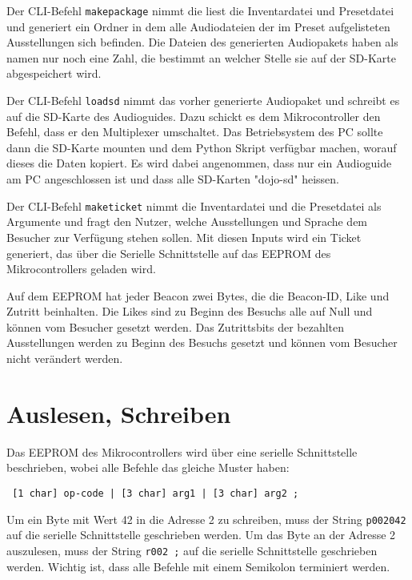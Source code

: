 Der CLI-Befehl \texttt{makepackage} nimmt die liest die Inventardatei und Presetdatei und generiert ein Ordner in dem alle Audiodateien der im Preset aufgelisteten Ausstellungen sich befinden.
Die Dateien des generierten Audiopakets haben als namen nur noch eine Zahl, die bestimmt an welcher Stelle sie auf der SD-Karte abgespeichert wird.

Der CLI-Befehl \texttt{loadsd} nimmt das vorher generierte Audiopaket und schreibt es auf die SD-Karte des Audioguides.
Dazu schickt es dem Mikrocontroller den Befehl, dass er den Multiplexer umschaltet.
Das Betriebsystem des PC sollte dann die SD-Karte mounten und dem Python Skript verfügbar machen, worauf dieses die Daten kopiert.
Es wird dabei angenommen, dass nur ein Audioguide am PC angeschlossen ist und dass alle SD-Karten "dojo-sd" heissen.

Der CLI-Befehl \texttt{maketicket} nimmt die Inventardatei und die Presetdatei als Argumente und fragt den Nutzer, welche Ausstellungen und Sprache dem Besucher zur Verfügung stehen sollen. 
Mit diesen Inputs wird ein Ticket generiert, das über die Serielle Schnittstelle auf das EEPROM des Mikrocontrollers geladen wird.

Auf dem EEPROM hat jeder Beacon zwei Bytes, die die Beacon-ID, Like und Zutritt beinhalten.
Die Likes sind zu Beginn des Besuchs alle auf Null und können vom Besucher gesetzt werden.
Das Zutrittsbits der bezahlten Ausstellungen werden zu Beginn des Besuchs gesetzt und können vom Besucher nicht verändert werden.


\section{Auslesen, Schreiben}
Das EEPROM des Mikrocontrollers wird über eine serielle Schnittstelle beschrieben, wobei alle Befehle das gleiche Muster haben:
\begin{verbatim} [1 char] op-code | [3 char] arg1 | [3 char] arg2 ; \end{verbatim}
Um ein Byte mit Wert 42 in die Adresse 2 zu schreiben, muss der String \texttt{p002042} auf die serielle Schnittstelle geschrieben werden.
Um das Byte an der Adresse 2 auszulesen, muss der String \texttt{r002   ;} auf die serielle Schnittstelle geschrieben werden.
Wichtig ist, dass alle Befehle mit einem Semikolon terminiert werden.

